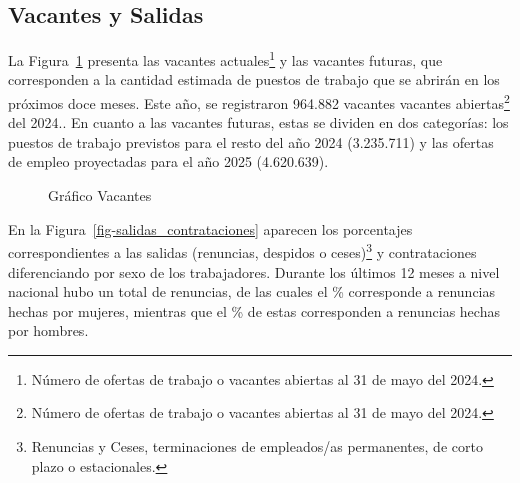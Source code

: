\documentclass[
  11pt,
]{article}
\begin{document}
\subsection{Vacantes y Salidas}\label{vacantes-y-salidas}

La Figura~\ref{fig-vacantes} presenta las vacantes actuales\footnote{Número
  de ofertas de trabajo o vacantes abiertas al 31 de mayo del 2024.} y
las vacantes futuras, que corresponden a la cantidad estimada de puestos
de trabajo que se abrirán en los próximos doce meses. Este año, se
registraron 964.882 vacantes vacantes abiertas\footnote{Número de
  ofertas de trabajo o vacantes abiertas al 31 de mayo del 2024.} del
2024.. En cuanto a las vacantes futuras, estas se dividen en dos
categorías: los puestos de trabajo previstos para el resto del año 2024
(3.235.711) y las ofertas de empleo proyectadas para el año 2025
(4.620.639).

\FloatBarrier

\begin{figure}[H]

\caption{\label{fig-vacantes}Gráfico Vacantes}


\end{figure}%

En la Figura~\ref{fig-salidas_contrataciones} aparecen los porcentajes
correspondientes a las salidas (renuncias, despidos o ceses)\footnote{Renuncias
  y Ceses, terminaciones de empleados/as permanentes, de corto plazo o
  estacionales.} y contrataciones diferenciando por sexo de los
trabajadores. Durante los últimos 12 meses a nivel nacional hubo un
total de  renuncias, de las cuales el \%
corresponde a renuncias hechas por mujeres, mientras que el
\% de estas corresponden a renuncias hechas por hombres.
\end{document}
